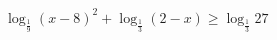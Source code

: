 \begin{ex}[type=inequality]
	\begin{condition}
		\( \log_{\frac{1}{9}}(x-8)^2+\log_{\frac{1}{3}}(2-x)\ge\log_{\frac{1}{3}}27\)
	\end{condition}
	\answer{\( [-1;2) \)}
\end{ex}